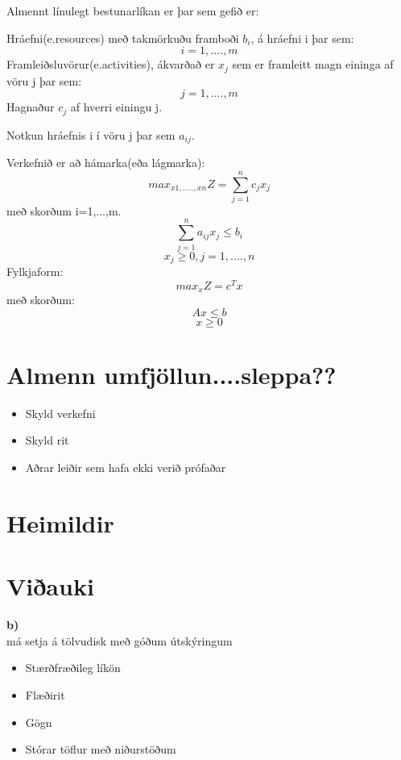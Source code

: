 \documentclass[a4paper,12pt]{article}
\begin{document}
Almennt línulegt bestunarlíkan er þar sem gefið er:

Hráefni(e.resources) með takmörkuðu framboði $b_i$, á hráefni i þar sem:
\[i=1,....,m\]
Framleiðsluvörur(e.activities), ákvarðað er $x_j$ sem er framleitt magn eininga af vöru j þar sem:
\[j=1,....,m\]
Hagnaður $c_j$ af hverri einingu j. 

Notkun hráefnis i í vöru j þar sem $a_{ij}$.

Verkefnið er að hámarka(eða lágmarka):
\[max_{x1,.....,xn}Z = \sum_{j=1}^{n}c_j x_j\]
með skorðum i=1,...,m.
\[\sum_{j=1}^{n}a_{ij} x_j\leq b_i\]
\[x_j\geq 0, j=1,....,n\]
Fylkjaform:
\[max_xZ=c^Tx\]
með skorðum:
\[Ax\leq b\]
\[x\geq 0\]

\section{Almenn umfjöllun....sleppa??}
\begin{itemize}
\item Skyld verkefni
\item Skyld rit
\item Aðrar leiðir sem hafa ekki verið prófaðar
\end{itemize}




\pagebreak
\section{Heimildir}



\pagebreak
\section{Viðauki}
\textbf{b)} \\


má setja á tölvudisk með góðum útskýringum
\begin{itemize}
\item Stærðfræðileg líkön
\item Flæðirit
\item Gögn
\item Stórar töflur með niðurstöðum
\end{itemize}
\end{document}

